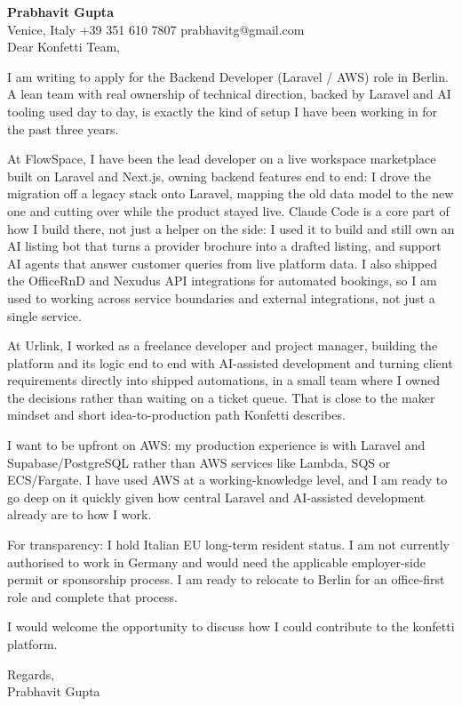 \documentclass[a4paper,10.5pt]{article}
\begin{document}
\textbf{Prabhavit Gupta}\\
Venice, Italy \textbar{} +39 351 610 7807 \textbar{} prabhavitg@gmail.com\\[10pt]
Dear Konfetti Team,

I am writing to apply for the Backend Developer (Laravel / AWS) role in Berlin. A lean team with real ownership of technical direction, backed by Laravel and AI tooling used day to day, is exactly the kind of setup I have been working in for the past three years.

At FlowSpace, I have been the lead developer on a live workspace marketplace built on Laravel and Next.js, owning backend features end to end: I drove the migration off a legacy stack onto Laravel, mapping the old data model to the new one and cutting over while the product stayed live. Claude Code is a core part of how I build there, not just a helper on the side: I used it to build and still own an AI listing bot that turns a provider brochure into a drafted listing, and support AI agents that answer customer queries from live platform data. I also shipped the OfficeRnD and Nexudus API integrations for automated bookings, so I am used to working across service boundaries and external integrations, not just a single service.

At Urlink, I worked as a freelance developer and project manager, building the platform and its logic end to end with AI-assisted development and turning client requirements directly into shipped automations, in a small team where I owned the decisions rather than waiting on a ticket queue. That is close to the maker mindset and short idea-to-production path Konfetti describes.

I want to be upfront on AWS: my production experience is with Laravel and Supabase/PostgreSQL rather than AWS services like Lambda, SQS or ECS/Fargate. I have used AWS at a working-knowledge level, and I am ready to go deep on it quickly given how central Laravel and AI-assisted development already are to how I work.

For transparency: I hold Italian EU long-term resident status. I am not currently authorised to work in Germany and would need the applicable employer-side permit or sponsorship process. I am ready to relocate to Berlin for an office-first role and complete that process.

I would welcome the opportunity to discuss how I could contribute to the konfetti platform.

Regards,\\
Prabhavit Gupta
\end{document}
